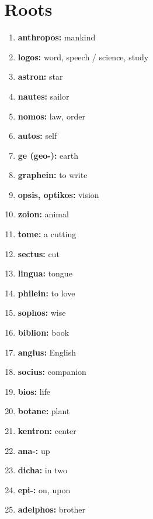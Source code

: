 \documentclass{article}
\begin{document}
\section{Roots}
\begin{enumerate}
    \item \textbf{anthropos: }{mankind}
    \item \textbf{logos: }{word, speech / science, study}
    \item \textbf{astron: }{star}
    \item \textbf{nautes: }{sailor}
    \item \textbf{nomos: }{law, order}
    \item \textbf{autos: }{self}
    \item \textbf{ge (geo-): }{earth}
    \item \textbf{graphein: }{to write}
    \item \textbf{opsis, optikos: }{vision}
    \item \textbf{zoion: }{animal}
    \item \textbf{tome: }{a cutting}
    \item \textbf{sectus: }{cut}
    \item \textbf{lingua: }{tongue}
    \item \textbf{philein: }{to love}
    \item \textbf{sophos: }{wise}
    \item \textbf{biblion: }{book}
    \item \textbf{anglus: }{English}
    \item \textbf{socius: }{companion}
    \item \textbf{bios: }{life}
    \item \textbf{botane: }{plant}
    \item \textbf{kentron: }{center}
    \item \textbf{ana-: }{up}
    \item \textbf{dicha: }{in two}
    \item \textbf{epi-: }{on, upon}
    \item \textbf{adelphos: }{brother}
    
\end{enumerate}
\end{document}
